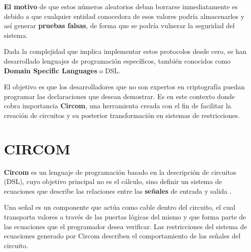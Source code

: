 \documentclass[a4paper,12pt]{report}
\begin{document}
	
	\noindent \textbf{El motivo} de que estos números aleatorios deban borrarse inmediatamente es debido a que cualquier entidad conocedora de esos valores podría almacenarlos y así generar \textbf{pruebas falsas}, de forma que se podría vulnerar la seguridad del sistema.
	
	
	\vspace{0.25cm}
	
	\noindent Dada la complejidad que implica implementar estos protocolos desde cero, se han desarrollado lenguajes de programación específicos, también conocidos como \textbf{Domain Specific Languages} o DSL.
	
	\vspace{0.25cm}
	
	\noindent El objetivo es que los desarrolladores que no son expertos en criptografía puedan programar las declaraciones que desean demostrar. Es en este contexto donde cobra importancia \textbf{Circom}, una herramienta creada con el fin de facilitar la creación de circuitos y su posterior transformación en sistemas de restricciones.
	
	\vspace{0.25cm}
	
	
	\section{CIRCOM}
	\label{s:circom}
	\noindent \textbf{Circom} es un lenguaje de programación basado en la descripción de circuitos (DSL), cuyo objetivo principal no es el cálculo, sino definir un sistema de ecuaciones que describe las relaciones entre las \textbf{señales} de entrada y salida \cite{thesis_clara}.
	
	\vspace{0.3cm}
	
	\noindent Una señal es un componente que actúa como cable dentro del circuito, el cual transporta valores a través de las puertas lógicas del mismo y que forma parte de las ecuaciones que el programador desea verificar. Las restricciones del sistema de ecuaciones generado por Circom describen el comportamiento de las señales del circuito.
	
\end{document}
